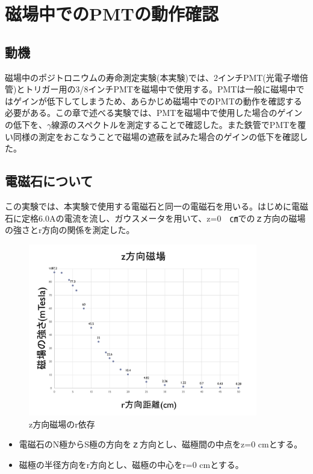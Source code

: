 \chapter{磁場中でのPMTの動作確認}\label{PMT}

\section{動機}
磁場中のポジトロニウムの寿命測定実験(本実験)では、2インチPMT(光電子増倍管)とトリガー用の3/8インチPMTを磁場中で使用する。PMTは一般に磁場中ではゲインが低下してしまうため、あらかじめ磁場中でのPMTの動作を確認する必要がある。この章で述べる実験では、PMTを磁場中で使用した場合のゲインの低下を、$\gamma$線源のスペクトルを測定することで確認した。また鉄管でPMTを覆い同様の測定をおこなうことで磁場の遮蔽を試みた場合のゲインの低下を確認した。



\section{電磁石について}
この実験では、本実験で使用する電磁石と同一の電磁石を用いる。はじめに電磁石に定格6.0Aの電流を流し、ガウスメータを用いて、z=0　㎝でのｚ方向の磁場の強さとr方向の関係を測定した。
\begin{figure}[H]
	\centering
		\includegraphics[width=10cm]{fig/iguchi/maggraph1.pdf}
	\caption{z方向磁場のr依存}
	\label{maggraph1}
\end{figure}

\begin{itemize}
       \item 電磁石のN極からS極の方向をｚ方向とし、磁極間の中点をz=0 cmとする。
       \item 磁極の半径方向をr方向とし、磁極の中心をr=0 cmとする。
\end{itemize}

